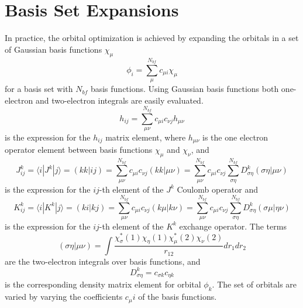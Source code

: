 \section{Basis Set Expansions}
\label{sec:basis}
In practice, the orbital optimization is achieved by expanding the
orbitals in a set of Gaussian basis functions
${\chi_\mu}$ 
\begin{equation}
  \phi_i = \sum_\mu^{N_{bf}} c_{\mu i}\chi_{\mu}
\label{eq:bset}
\end{equation}
for a basis set with $N_{bf}$ basis functions. Using
Gaussian basis functions both one-electron and two-electron integrals
are easily evaluated.
\begin{equation}
  h_{ij} = \sum_{\mu\nu}^{N_{bf}}c_{\mu i}c_{\nu j}h_{\mu\nu}
\label{eq:hij}
\end{equation}	
is the expression for the $h_{ij}$ matrix element, where
$h_{\mu\nu}$ is the one electron operator element between basis
functions $\chi_\mu$ and $\chi_\nu$, and
\begin{equation}
  J_{ij}^k = \langle i|J^k|j \rangle 
	= (kk|ij) 
	= \sum_{\mu\nu}^{N_{bf}} c_{\mu i}c_{\nu j}(kk|\mu\nu) 
	= \sum_{\mu\nu}^{N_{bf}} c_{\mu i}c_{\nu j}
	\sum_{\sigma\eta}^{N_{bf}}D_{\sigma\eta}^k 
	(\sigma\eta|\mu\nu)
\label{eq:jij}
\end{equation}
is the expression for the $ij$-th element of the $J^k$ Coulomb
operator and
\begin{equation}
  K_{ij}^k = \langle i|K^k|j \rangle 
	= (ki|kj) 
	= \sum_{\mu\nu}^{N_{bf}} c_{\mu i}c_{\nu j}(k\mu|k\nu) 
	= \sum_{\mu\nu}^{N_{bf}} c_{\mu i}c_{\nu j}
	\sum_{\sigma\eta}^{N_{bf}}D_{\sigma\eta}^k
	(\sigma\mu|\eta\nu)
\label{eq:kij}
\end{equation}
is the expression for the $ij$-th element of the $K^k$
exchange operator. The terms
\begin{equation}
  (\sigma\eta|\mu\nu) = \int\frac{\chi_\sigma^*(1)\chi_\eta(1)
	\chi_\mu^*(2)\chi_\nu(2)}{r_{12}}dr_1dr_2
\end{equation}
are the two-electron integrals over basis functions, and 
\begin{equation}
  D_{\sigma\eta}^k = c_{\sigma k}c_{\eta k}
\label{eq:dens}
\end{equation}
is the corresponding density matrix element for orbital
$\phi_k$. The set of orbitals are varied by varying the coefficients
$c_\mu i$ of the basis functions.

